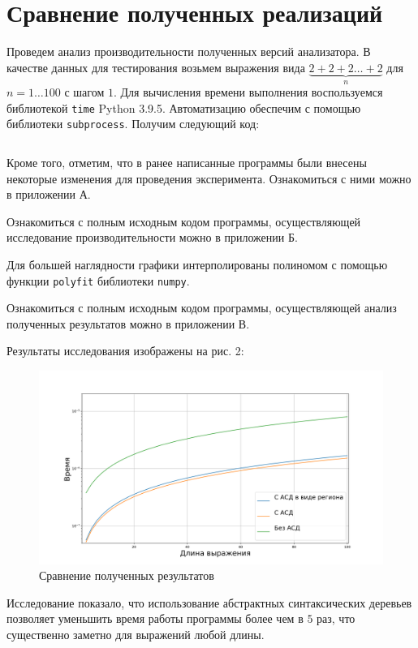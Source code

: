 \documentclass[bachelor, och, otchet]{SCWorks}
\begin{document}
\section{Сравнение полученных реализаций}
Проведем анализ производительности полученных версий анализатора. В качестве
данных для тестирования возьмем выражения вида $\underbrace{2 + 2 + 2 \dots + 2}_{n}$ для $n =
1\dots100$ с шагом $1$. Для вычисления времени выполнения воспользуемся
библиотекой \verb|time| Python 3.9.5. Автоматизацию обеспечим с помощью
библиотеки \verb|subprocess|. Получим следующий код:

\inputminted{python}{test.py}

Кроме того, отметим, что в ранее написанные программы были внесены некоторые изменения для проведения эксперимента. Ознакомиться с ними можно в приложении А.

Ознакомиться с полным исходным кодом программы, осуществляющей
исследование производительности можно в приложении Б.

Для большей наглядности графики интерполированы полиномом с помощью функции \verb|polyfit| библиотеки \verb|numpy|.

Ознакомиться с полным исходным кодом программы, осуществляющей
анализ полученных результатов можно в приложении В.

Результаты исследования изображены на рис. 2:

\begin{figure}[hbt!]
    \centering
    \includegraphics[scale=0.5]{benchmark.png}
    \caption{Сравнение полученных результатов}
    \label{fig:benchmark}
\end{figure}

Исследование показало, что использование абстрактных синтаксических деревьев позволяет уменьшить время работы программы более чем в $5$ раз, что существенно заметно для выражений любой длины.
\end{document}
